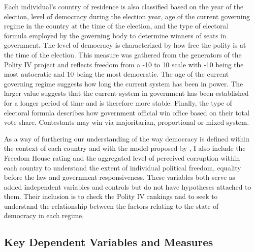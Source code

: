 \documentclass[12pt, titlepage]{article}
\begin{document}
Each individual's country of residence is also classified based on the year of the election, level of democracy during the election year,  age of the current governing regime in the country at the time of the election, and the type of electoral formula employed by the governing body to determine winners of seats in government. The level of democracy is characterized by how free the polity is at the time of the election. This measure was gathered from the generators of the Polity IV project and reflects freedom from a -10 to 10 scale with -10 being the most autocratic and 10 being the most democratic. The age of the current governing regime suggests how long the current system has been in power. The larger value suggests that the current system in government has been established for a longer period of time and is therefore more stable. Finally, the type of electoral formula describes how government official win office based on their total vote share. Contestants may win via majoritarian, proportional or mixed system. 

As a way of furthering our understanding of the way democracy is defined within the context of each country and with the model proposed by \cite{diamond2004overview}, I also include the Freedom House rating and the aggregated level of perceived corruption within each country to understand the extent of individual political freedom, equality before the law and government responsiveness. These variables both serve as added independent variables and controls but do not have hypotheses attached to them. Their inclusion is to check the Polity IV rankings and to seek to understand the relationship between the factors relating to the state of democracy in each regime.


\subsection{Key Dependent Variables and Measures}
\end{document}
